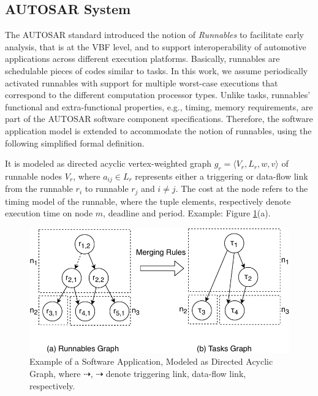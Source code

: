 \subsection{AUTOSAR System}\label{subsec_autosarsystem}
The AUTOSAR standard introduced the notion of \textit{Runnables} to facilitate early analysis, that is at the VBF level, and to support interoperability of automotive applications across different execution platforms. Basically, runnables are schedulable pieces of codes similar to tasks. In this work, we assume periodically activated runnables with support for multiple worst-case executions that correspond to the different computation processor types. Unlike tasks, runnables' functional and extra-functional properties, e.g., timing, memory requirements, are part of the AUTOSAR software component specifications. Therefore, the software application model is extended to accommodate the notion of runnables, using the following simplified formal definition.

\begin{definition}
It is modeled as directed acyclic vertex-weighted graph $g_r=\langle V_r, L_r, w, v\rangle$ of runnable nodes $V_r$, where $a_{ij}\in L_r$ represents either a triggering or data-flow link from the runnable $r_i$ to runnable $r_j$ and $i\neq j$. The cost at the node refers to the timing model of the runnable, where the tuple elements, respectively denote execution time on node $m$, deadline and period. Example: Figure \ref{fig_appexample}(a).
\end{definition}

\begin{figure}[h!]
	\centering
	\includegraphics[width=0.7\linewidth]{img/runnable_task_dag}
	\caption[Example of a Software Application.]{Example of a Software Application, Modeled as Directed Acyclic Graph, where $\dashrightarrow$, $\dashrightarrow$ denote triggering link, data-flow link, respectively.}
	\label{fig_appexample}
\end{figure}

